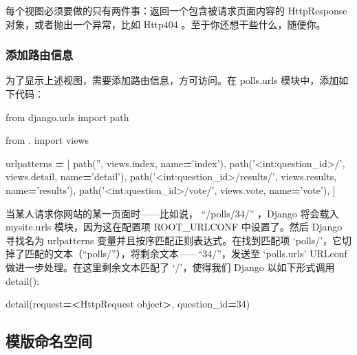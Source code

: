 \documentclass[]{ctexbook}
\newenvironment{Shaded}{\begin{snugshade}}{\end{snugshade}}
\newcommand{\BuiltInTok}[1]{#1}
\newcommand{\DecValTok}[1]{\textcolor[rgb]{0.00,0.00,0.81}{#1}}
\newcommand{\ImportTok}[1]{#1}
\newcommand{\NormalTok}[1]{#1}
\newcommand{\OperatorTok}[1]{\textcolor[rgb]{0.81,0.36,0.00}{\textbf{#1}}}
\newcommand{\StringTok}[1]{\textcolor[rgb]{0.31,0.60,0.02}{#1}}
\begin{document}
每个视图必须要做的只有两件事：返回一个包含被请求页面内容的 HttpResponse 对象，或者抛出一个异常，比如 Http404 。至于你还想干些什么，随便你。

\hypertarget{ux6dfbux52a0ux8defux7531ux4fe1ux606f}{%
\subsubsection{添加路由信息}\label{ux6dfbux52a0ux8defux7531ux4fe1ux606f}}

为了显示上述视图，需要添加路由信息，方可访问。在 polls.urls 模块中，添加如下代码：

\begin{Shaded}
\begin{Highlighting}[]
\ImportTok{from}\NormalTok{ django.urls }\ImportTok{import}\NormalTok{ path}

\ImportTok{from}\NormalTok{ . }\ImportTok{import}\NormalTok{ views}

\NormalTok{urlpatterns }\OperatorTok{=}\NormalTok{ [}
\NormalTok{    path(}\StringTok{''}\NormalTok{, views.index, name}\OperatorTok{=}\StringTok{'index'}\NormalTok{),}
\NormalTok{    path(}\StringTok{'<int:question_id>/'}\NormalTok{, views.detail, name}\OperatorTok{=}\StringTok{'detail'}\NormalTok{),}
\NormalTok{    path(}\StringTok{'<int:question_id>/results/'}\NormalTok{, views.results, name}\OperatorTok{=}\StringTok{'results'}\NormalTok{),}
\NormalTok{    path(}\StringTok{'<int:question_id>/vote/'}\NormalTok{, views.vote, name}\OperatorTok{=}\StringTok{'vote'}\NormalTok{),}
\NormalTok{]}
\end{Highlighting}
\end{Shaded}

当某人请求你网站的某一页面时------比如说， ``/polls/34/'' ，Django 将会载入 mysite.urls 模块，因为这在配置项 ROOT\_URLCONF 中设置了。然后 Django 寻找名为 urlpatterns 变量并且按序匹配正则表达式。在找到匹配项 `polls/'，它切掉了匹配的文本（``polls/''），将剩余文本------``34/''，发送至 `polls.urls' URLconf 做进一步处理。在这里剩余文本匹配了 `/'，使得我们 Django 以如下形式调用 detail():

\begin{Shaded}
\begin{Highlighting}[]
\NormalTok{detail(request}\OperatorTok{=<}\NormalTok{HttpRequest }\BuiltInTok{object}\OperatorTok{>}\NormalTok{, question_id}\OperatorTok{=}\DecValTok{34}\NormalTok{)}
\end{Highlighting}
\end{Shaded}

\hypertarget{ux6a21ux7248ux547dux540dux7a7aux95f4}{%
\subsection{模版命名空间}\label{ux6a21ux7248ux547dux540dux7a7aux95f4}}
\end{document}
